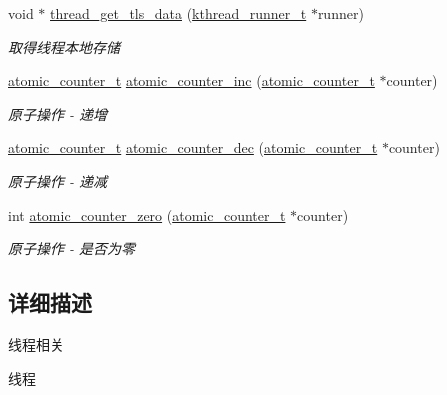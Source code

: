 \begin{DoxyCompactItemize}
void $\ast$ \hyperlink{a00121_gaf5bb2dd001c42fdbdcdcb2048f76ae89_gaf5bb2dd001c42fdbdcdcb2048f76ae89}{thread\+\_\+get\+\_\+tls\+\_\+data} (\hyperlink{a00056_a4f78c259c9527c821f1a6f87495dd339_a4f78c259c9527c821f1a6f87495dd339}{kthread\+\_\+runner\+\_\+t} $\ast$runner)
\begin{DoxyCompactList}\small\item\em 取得线程本地存储 \end{DoxyCompactList}\item 
\hyperlink{a00056_a0d043bbb6b8db19fea54ab9271d352b6_a0d043bbb6b8db19fea54ab9271d352b6}{atomic\+\_\+counter\+\_\+t} \hyperlink{a00121_gade4f41f1cd519f2719b5114ce7801232_gade4f41f1cd519f2719b5114ce7801232}{atomic\+\_\+counter\+\_\+inc} (\hyperlink{a00056_a0d043bbb6b8db19fea54ab9271d352b6_a0d043bbb6b8db19fea54ab9271d352b6}{atomic\+\_\+counter\+\_\+t} $\ast$counter)
\begin{DoxyCompactList}\small\item\em 原子操作 -\/ 递增 \end{DoxyCompactList}\item 
\hyperlink{a00056_a0d043bbb6b8db19fea54ab9271d352b6_a0d043bbb6b8db19fea54ab9271d352b6}{atomic\+\_\+counter\+\_\+t} \hyperlink{a00121_gafc2df03d75cf9168b72e8c5e11953437_gafc2df03d75cf9168b72e8c5e11953437}{atomic\+\_\+counter\+\_\+dec} (\hyperlink{a00056_a0d043bbb6b8db19fea54ab9271d352b6_a0d043bbb6b8db19fea54ab9271d352b6}{atomic\+\_\+counter\+\_\+t} $\ast$counter)
\begin{DoxyCompactList}\small\item\em 原子操作 -\/ 递减 \end{DoxyCompactList}\item 
int \hyperlink{a00121_ga141897cac9743394a99ff7780daa6a80_ga141897cac9743394a99ff7780daa6a80}{atomic\+\_\+counter\+\_\+zero} (\hyperlink{a00056_a0d043bbb6b8db19fea54ab9271d352b6_a0d043bbb6b8db19fea54ab9271d352b6}{atomic\+\_\+counter\+\_\+t} $\ast$counter)
\begin{DoxyCompactList}\small\item\em 原子操作 -\/ 是否为零 \end{DoxyCompactList}\end{DoxyCompactItemize}


\subsection{详细描述}
线程相关 


\begin{DoxyPre}
线程\end{DoxyPre}



